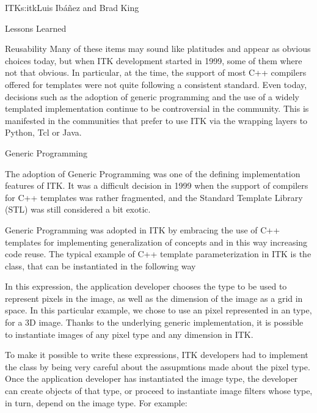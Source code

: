 \begin{aosachapter}{ITK}{s:itk}{Luis Ib\'{a}\~{n}ez and Brad King}
\begin{aosasect1}{Lessons Learned}
\begin{aosasect2}{Reusability}
Many of these items may sound like platitudes and appear as obvious choices
today, but when ITK development started in 1999, some of them where not that
obvious. In particular, at the time, the support of most C++ compilers offered
for templates were not quite following a consistent standard. Even today,
decisions such as the adoption of generic programming and the use of a widely
templated implementation continue to be controversial in the community. This is
manifested in the communities that prefer to use ITK via the wrapping layers to
Python, Tcl or Java.


\begin{aosasect3}{Generic Programming}

The adoption of Generic Programming was one of the defining implementation
features of ITK. It was a difficult decision in 1999 when the support of
compilers for C++ templates was rather fragmented, and the Standard Template
Library (STL) was still considered a bit exotic.

Generic Programming was adopted in ITK by embracing the use of C++ templates
for implementing generalization of concepts and in this way increasing code
reuse. The typical example of C++ template parameterization in ITK is the
 class, that can be instantiated in the following way

\begin{aosaitemize}
\item {}
\item {}
\item {}
\item {}
\end{aosaitemize}

In this expression, the application developer chooses the type to be used to
represent pixels in the image, as well as the dimension of the image as a grid
in space. In this particular example, we chose to use an  pixel
represented in an  type, for a 3D image. Thanks to the
underlying generic implementation, it is possible to instantiate images
of any pixel type and any dimension in ITK.

To make it possible to write these expressions, ITK developers had to implement
the  class by being very careful about the assupmtions made about
the pixel type.  Once the application developer has instantiated the image
type, the developer can create objects of that type, or  proceed to instantiate
image filters whose type, in turn, depend on the image type.  For example:


\end{aosasect3}
\end{aosasect2}
\end{aosasect1}
\end{aosachapter}
